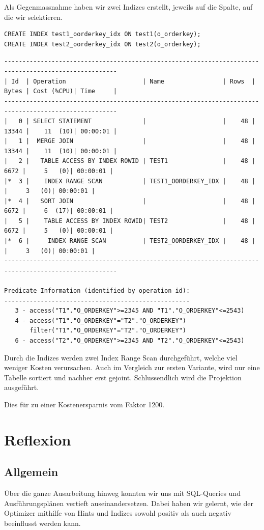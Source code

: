 \documentclass[10pt]{article}
\begin{document}
\newpage
Als Gegenmassnahme haben wir zwei Indizes erstellt, jeweils auf die Spalte, auf 
die wir selektieren. 
\begin{lstlisting}[style=sql]
CREATE INDEX test1_oorderkey_idx ON test1(o_orderkey);
CREATE INDEX test2_oorderkey_idx ON test2(o_orderkey);
\end{lstlisting}
\begin{lstlisting}[style=queryexecutionplanSmall]
-----------------------------------------------------------------------------------------------------
| Id  | Operation                     | Name                | Rows  | Bytes | Cost (%CPU)| Time     |
-----------------------------------------------------------------------------------------------------
|   0 | SELECT STATEMENT              |                     |    48 | 13344 |    11  (10)| 00:00:01 |
|   1 |  MERGE JOIN                   |                     |    48 | 13344 |    11  (10)| 00:00:01 |
|   2 |   TABLE ACCESS BY INDEX ROWID | TEST1               |    48 |  6672 |     5   (0)| 00:00:01 |
|*  3 |    INDEX RANGE SCAN           | TEST1_OORDERKEY_IDX |    48 |       |     3   (0)| 00:00:01 |
|*  4 |   SORT JOIN                   |                     |    48 |  6672 |     6  (17)| 00:00:01 |
|   5 |    TABLE ACCESS BY INDEX ROWID| TEST2               |    48 |  6672 |     5   (0)| 00:00:01 |
|*  6 |     INDEX RANGE SCAN          | TEST2_OORDERKEY_IDX |    48 |       |     3   (0)| 00:00:01 |
-----------------------------------------------------------------------------------------------------
 
Predicate Information (identified by operation id):
---------------------------------------------------
   3 - access("T1"."O_ORDERKEY">=2345 AND "T1"."O_ORDERKEY"<=2543)
   4 - access("T1"."O_ORDERKEY"="T2"."O_ORDERKEY")
       filter("T1"."O_ORDERKEY"="T2"."O_ORDERKEY")
   6 - access("T2"."O_ORDERKEY">=2345 AND "T2"."O_ORDERKEY"<=2543)
\end{lstlisting}
Durch die Indizes werden zwei Index Range Scan durchgeführt, welche viel weniger Kosten verursachen. 
Auch im Vergleich zur ersten Variante, wird nur eine Tabelle sortiert und nachher erst gejoint. 
Schlussendlich wird die Projektion ausgeführt.

Dies für zu einer Kostenersparnis vom Faktor 1200.

\newpage
\section{Reflexion}
\subsection{Allgemein}
Über die ganze Ausarbeitung hinweg konnten wir uns mit SQL-Queries und Ausführungsplänen vertieft auseinandersetzen.
Dabei haben wir gelernt, wie der Optimizer mithilfe von Hints und Indizes sowohl positiv als auch negativ beeinflusst werden kann.
\end{document}
